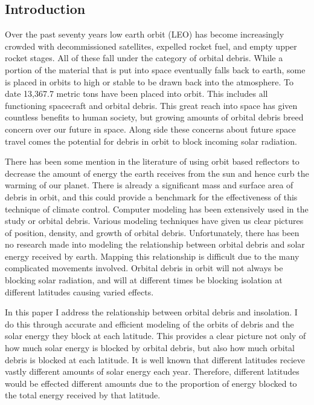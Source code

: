 \documentclass[11pt]{article}
\begin{document}
\begin{multicols*}{2}

\section{Introduction} \label{intro}
Over the past seventy years low earth orbit (LEO) has become increasingly crowded with decommissioned satellites, expelled rocket fuel, and empty upper rocket stages. All of these fall under the category of orbital debris. While a portion of the material that is put into space eventually falls back to earth, some is placed in orbits to high or stable to be drawn back into the atmosphere. To date 13,367.7 metric tons have been placed into orbit. \cite{John} This includes all functioning spacecraft and orbital debris. This great reach into space has given countless benefits to human society, but growing amounts of orbital debris breed concern over our future in space. Along side these concerns about future space travel comes the potential for debris in orbit to block incoming solar radiation.

There has been some mention in the literature of using orbit based reflectors to decrease the amount of energy the earth receives from the sun and hence curb the warming of our planet. \cite{john} There is already a significant mass and surface area of debris in orbit, and this could provide a benchmark for the effectiveness of this technique of climate control. Computer modeling has been extensively used in the study or orbital debris. Various modeling techniques have given us clear pictures of position, density, and growth of orbital debris.\cite{john} Unfortunately, there has been no research made into modeling the relationship between orbital debris and solar energy received by earth. Mapping this relationship is difficult due to the many complicated movements involved. Orbital debris in orbit will not always be blocking solar radiation, and will at different times be blocking isolation at different latitudes causing varied effects. 

In this paper I address the relationship between orbital debris and insolation. I do this through accurate and efficient modeling of the orbits of debris and the solar energy they block at each latitude. This provides a clear picture not only of how much solar energy is blocked by orbital debris, but also how much orbital debris is blocked at each latitude. It is well known that different latitudes recieve vastly different amounts of solar energy each year.\cite{john} Therefore, different latitudes would be effected different amounts due to the proportion of energy blocked to the total energy received by that latitude.


\end{multicols*}
\end{document}

